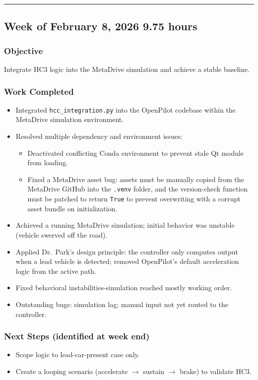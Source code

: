 \documentclass[12pt]{article}
\begin{document}
\hrule\vspace{0.5em}

\subsection{Week of February 8, 2026 \hfill \normalfont\small 9.75 hours}

\subsubsection{Objective}
Integrate HC3 logic into the MetaDrive simulation and achieve a stable baseline.

\subsubsection{Work Completed}
\begin{itemize}
  \item Integrated \texttt{hcc\_integration.py} into the OpenPilot codebase within the MetaDrive simulation environment.
  \item Resolved multiple dependency and environment issues:
    \begin{itemize}
      \item Deactivated conflicting Conda environment to prevent stale Qt module from loading.
      \item Fixed a MetaDrive asset bug: assets must be manually copied from the MetaDrive GitHub into the \texttt{.venv} folder, and the version-check function must be patched to return \texttt{True} to prevent overwriting with a corrupt asset bundle on initialization.
    \end{itemize}
  \item Achieved a running MetaDrive simulation; initial behavior was unstable (vehicle swerved off the road).
  \item Applied Dr.\ Park's design principle: the controller only computes output when a lead vehicle is detected; removed OpenPilot's default acceleration logic from the active path.
  \item Fixed behavioral instabilities-simulation reached mostly working order.
  \item Outstanding bugs: simulation lag; manual input not yet routed to the controller.
\end{itemize}

\subsubsection{Next Steps (identified at week end)}
\begin{itemize}
  \item Scope logic to lead-car-present case only.
  \item Create a looping scenario (accelerate $\to$ sustain $\to$ brake) to validate HC3.
\end{itemize}
\end{document}

